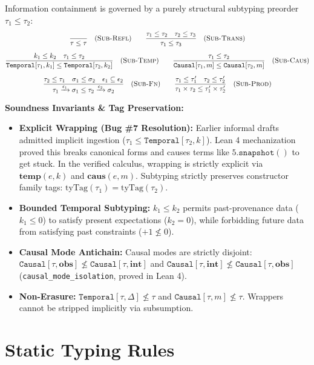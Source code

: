 \documentclass[11pt,a4paper]{article}
\theoremstyle{definition}
\theoremstyle{plain}
\newcommand{\ty}[1]{\texttt{#1}}
\newcommand{\sub}{\le}
\newcommand{\Temp}{\ty{Temporal}}
\newcommand{\Caus}{\ty{Causal}}
\begin{document}
Information containment is governed by a purely structural subtyping preorder $\tau_1 \sub \tau_2$:
\begin{gather*}
\frac{}{\tau \sub \tau} \quad (\textsc{Sub-Refl}) \qquad
\frac{\tau_1 \sub \tau_2 \quad \tau_2 \sub \tau_3}{\tau_1 \sub \tau_3} \quad (\textsc{Sub-Trans}) \\[6pt]
\frac{k_1 \le k_2 \quad \tau_1 \sub \tau_2}{\Temp[\tau_1, k_1] \sub \Temp[\tau_2, k_2]} \quad (\textsc{Sub-Temp}) \qquad
\frac{\tau_1 \sub \tau_2}{\Caus[\tau_1, m] \sub \Caus[\tau_2, m]} \quad (\textsc{Sub-Caus}) \\[6pt]
\frac{\tau_2 \sub \tau_1 \quad \sigma_1 \sub \sigma_2 \quad \epsilon_1 \subseteq \epsilon_2}{\tau_1 \xrightarrow{\epsilon_1} \sigma_1 \sub \tau_2 \xrightarrow{\epsilon_2} \sigma_2} \quad (\textsc{Sub-Fn}) \qquad
\frac{\tau_1 \sub \tau_1' \quad \tau_2 \sub \tau_2'}{\tau_1 \times \tau_2 \sub \tau_1' \times \tau_2'} \quad (\textsc{Sub-Prod})
\end{gather*}

\noindent
\textbf{Soundness Invariants \& Tag Preservation:}
\begin{itemize}[itemsep=1pt]
  \item \textbf{Explicit Wrapping (Bug \#7 Resolution):} Earlier informal drafts admitted implicit ingestion ($\tau_1 \sub \Temp[\tau_2, k]$). Lean 4 mechanization proved this breaks canonical forms and causes terms like $5.\ty{snapshot}()$ to get stuck. In the verified calculus, wrapping is strictly explicit via $\mathbf{temp}(e, k)$ and $\mathbf{caus}(e, m)$. Subtyping strictly preserves constructor family tags: $\text{tyTag}(\tau_1) = \text{tyTag}(\tau_2)$.
  \item \textbf{Bounded Temporal Subtyping:} $k_1 \le k_2$ permits past-provenance data ($k_1 \le 0$) to satisfy present expectations ($k_2 = 0$), while forbidding future data from satisfying past constraints ($+1 \not\le 0$).
  \item \textbf{Causal Mode Antichain:} Causal modes are strictly disjoint: $\Caus[\tau, \mathbf{obs}] \not\sub \Caus[\tau, \mathbf{int}]$ and $\Caus[\tau, \mathbf{int}] \not\sub \Caus[\tau, \mathbf{obs}]$ (\texttt{causal\_mode\_isolation}, proved in Lean 4).
  \item \textbf{Non-Erasure:} $\Temp[\tau, \Delta] \not\sub \tau$ and $\Caus[\tau, m] \not\sub \tau$. Wrappers cannot be stripped implicitly via subsumption.
\end{itemize}

\section{Static Typing Rules}
\end{document}

